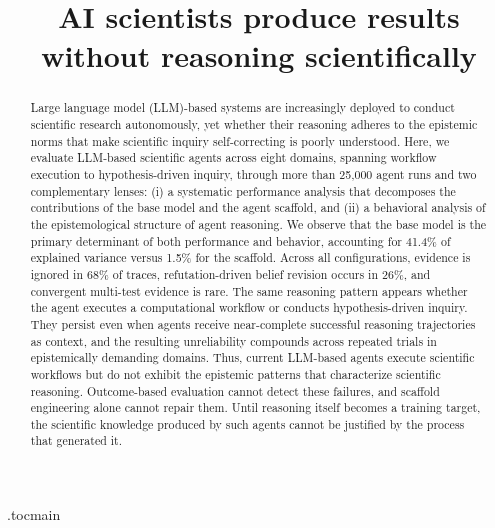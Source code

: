 \documentclass[11pt, oneside]{article}
\title{\textsf{AI scientists produce results without reasoning scientifically}}
\begin{document}
\etocdepthtag.toc{main}
\maketitle
\vspace*{-1em}
\begin{abstract}
\noindent Large language model (LLM)-based systems are increasingly deployed to conduct scientific research autonomously, yet whether their reasoning adheres to the epistemic norms that make scientific inquiry self-correcting is poorly understood. Here, we evaluate LLM-based scientific agents across eight domains, spanning workflow execution to hypothesis-driven inquiry, through more than 25,000 agent runs and two complementary lenses: (i) a systematic performance analysis that decomposes the contributions of the base model and the agent scaffold, and (ii) a behavioral analysis of the epistemological structure of agent reasoning. We observe that the base model is the primary determinant of both performance and behavior, accounting for 41.4\% of explained variance versus 1.5\% for the scaffold. Across all configurations, evidence is ignored in 68\% of traces, refutation-driven belief revision occurs in 26\%, and convergent multi-test evidence is rare. The same reasoning pattern appears whether the agent executes a computational workflow or conducts hypothesis-driven inquiry. They persist even when agents receive near-complete successful reasoning trajectories as context, and the resulting unreliability compounds across repeated trials in epistemically demanding domains. Thus, current LLM-based agents execute scientific workflows but do not exhibit the epistemic patterns that characterize scientific reasoning. Outcome-based evaluation cannot detect these failures, and scaffold engineering alone cannot repair them. Until reasoning itself becomes a training target, the scientific knowledge produced by such agents cannot be justified by the process that generated it.
\end{abstract}

\pagebreak

\begin{refsection}













\normalsize 

\clearpage
\printbibliography
\end{refsection}
\clearpage
\end{document}
